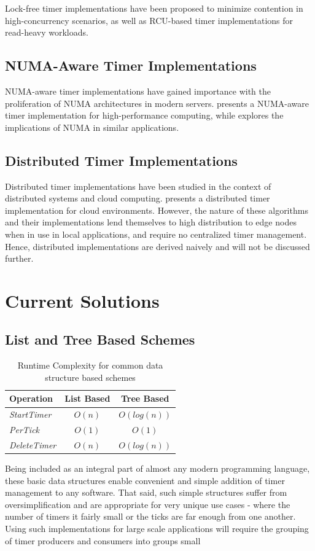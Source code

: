 \documentclass[conference]{IEEEtran}
\newcommand{\complexity}[9]{
\begin{table}[ht]
	\begin{center}
		\begin{tabular}{l|c|c}
			\textbf{Operation} & \textbf{#1} & \textbf{#2} \\
			\hline
			\textit{StartTimer} & $O(#3)$ & $O(#4)$ \\
			\textit{PerTick} & $O(#5)$ & $O(#6)$ \\
			\textit{DeleteTimer} &  $O(#7)$ & $O(#8)$ \\
		\end{tabular}
		\linebreak
		\caption{Runtime Complexity for #9}
	\end{center}
\end{table}
}
\begin{document}
Lock-free timer implementations have been proposed to minimize contention in high-concurrency scenarios, as well as RCU-based timer implementations for read-heavy workloads.

\subsection{NUMA-Aware Timer Implementations}
NUMA-aware timer implementations have gained importance with the proliferation of NUMA architectures in modern servers. \cite{smartpq} presents a NUMA-aware timer implementation for high-performance computing, while \cite{numasched} explores the implications of NUMA in similar applications.

\subsection{Distributed Timer Implementations}
Distributed timer implementations have been studied in the context of distributed systems and cloud computing. \cite{autoscale} presents a distributed timer implementation for cloud environments. However, the nature of these algorithms and their implementations lend themselves to high distribution to edge nodes when in use in local applications, and require no centralized timer management. Hence, distributed implementations are derived naively and will not be discussed further.


\section{Current Solutions}

\subsection{List and Tree Based Schemes}

\complexity{List Based}{Tree Based}{n}{log(n)}{1}{1}{n}{log(n)}{common data structure based schemes}

Being included as an integral part of almost any modern programming language, these basic data structures enable convenient and simple addition of timer management to any software. That said, such simple structures suffer from oversimplification and are appropriate for very unique use cases - where the number of timers it fairly small or the ticks are far enough from one another. Using such implementations for large scale applications will require the grouping of timer producers and consumers into groups small 
\end{document}
